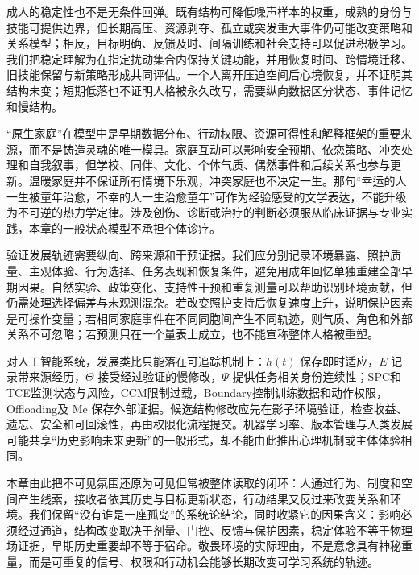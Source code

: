 成人的稳定性也不是无条件回弹。既有结构可降低噪声样本的权重，成熟的身份与技能可提供边界，但长期高压、资源剥夺、孤立或突发重大事件仍可能改变策略和关系模型；相反，目标明确、反馈及时、间隔训练和社会支持可以促进积极学习。我们把稳定理解为在指定扰动集合内保持关键功能，并用恢复时间、跨情境迁移、旧技能保留与新策略形成共同评估。一个人离开压迫空间后心境恢复，并不证明其结构未变；短期低落也不证明人格被永久改写，需要纵向数据区分状态、事件记忆和慢结构。

“原生家庭”在模型中是早期数据分布、行动权限、资源可得性和解释框架的重要来源，而不是铸造灵魂的唯一模具。家庭互动可以影响安全预期、依恋策略、冲突处理和自我叙事，但学校、同伴、文化、个体气质、偶然事件和后续关系也参与更新。温暖家庭并不保证所有情境下乐观，冲突家庭也不决定一生。那句“幸运的人一生被童年治愈，不幸的人一生治愈童年”可作为经验感受的文学表达，不能升级为不可逆的热力学定律。涉及创伤、诊断或治疗的判断必须服从临床证据与专业实践，本章的一般状态模型不承担个体诊疗。

验证发展轨迹需要纵向、跨来源和干预证据。我们应分别记录环境暴露、照护质量、主观体验、行为选择、任务表现和恢复条件，避免用成年回忆单独重建全部早期因果。自然实验、政策变化、支持性干预和重复测量可以帮助识别环境贡献，但仍需处理选择偏差与未观测混杂。若改变照护支持后恢复速度上升，说明保护因素是可操作变量；若相同家庭事件在不同同胞间产生不同轨迹，则气质、角色和外部关系不可忽略；若预测只在一个量表上成立，也不能宣称整体人格被重塑。

对人工智能系统，发展类比只能落在可追踪机制上：$h(t)$ 保存即时适应，$E$ 记录带来源经历，$\Theta$ 接受经过验证的慢修改，$\Psi$ 提供任务相关身份连续性；SPC和TCE监测状态与风险，CCM限制过载，Boundary控制训练数据和动作权限，Offloading及 $\mathrm{Me}$ 保存外部证据。候选结构修改应先在影子环境验证，检查收益、遗忘、安全和可回滚性，再由权限化流程提交。机器学习率、版本管理与人类发展可能共享“历史影响未来更新”的一般形式，却不能由此推出心理机制或主体体验相同。

本章由此把不可见氛围还原为可见但常被整体读取的闭环：人通过行为、制度和空间产生线索，接收者依其历史与目标更新状态，行动结果又反过来改变关系和环境。我们保留“没有谁是一座孤岛”的系统论结论，同时收紧它的因果含义：影响必须经过通道，结构改变取决于剂量、门控、反馈与保护因素，稳定体验不等于物理场证据，早期历史重要却不等于宿命。敬畏环境的实际理由，不是意念具有神秘重量，而是可重复的信号、权限和行动机会能够长期改变可学习系统的轨迹。
